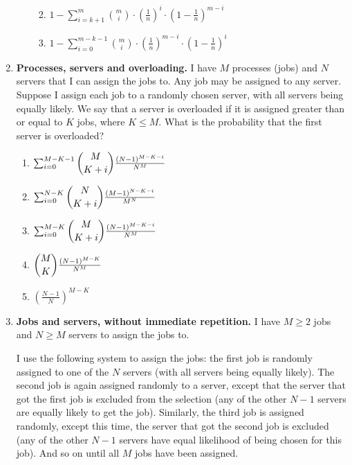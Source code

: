 \documentclass[11pt, preview]{standalone} %
\begin{document}
\begin{enumerate}
\begin{enumerate}
\begin{Multi}
\begin{enumerate}
\TrueChoice\item $1 - \sum_{i = k+1}^{m}\binom{m}{i}\cdot\left(\frac{1}{n}\right)^{i}\cdot \left(1-\frac{1}{n}\right)^{m-i}$
\TrueChoice\item $1 - \sum_{i = 0}^{m-k-1}\binom{m}{i}\cdot\left(\frac{1}{n}\right)^{m-i}\cdot \left(1-\frac{1}{n}\right)^{i}$
\end{enumerate}
\end{Multi}
\end{enumerate}
\item {\bf Processes, servers and overloading.} I have $M$ processes (jobs) and 
    $N$ servers that I can assign the jobs to. Any job may be assigned to any 
    server. Suppose I assign each job to a randomly chosen server, with all 
    servers being equally likely. We say that a server is overloaded if it is 
    assigned greater than or equal to $K$ jobs, where $K \leq M$. What is the 
    probability that the first server is overloaded?
\begin{Multi}
\begin{enumerate}
    \FalseChoice\item $\sum_{i=0}^{M-K-1} \dbinom{M}{K+i} \frac{(N-1)^{M-K-i}}{N^{M}}$
    \FalseChoice\item $\sum_{i=0}^{N-K} \dbinom{N}{K+i} \frac{(M-1)^{N-K-i}}{M^{N}}$
    \TrueChoice\item $\sum_{i=0}^{M-K} \dbinom{M}{K+i} \frac{(N-1)^{M-K-i}}{N^{M}}$
    \FalseChoice\item $\dbinom{M}{K} \frac{(N-1)^{M-K}}{N^{M}}$
    \FalseChoice\item $\left(\frac{N-1}{N}\right)^{M-K}$
\end{enumerate}
\end{Multi}
\item {\bf Jobs and servers, without immediate repetition.} I have $M\geq 2$ 
    jobs and $N \geq M$ servers to assign the jobs to.
    
    I use the following system to assign the jobs: the 
    first job is randomly assigned to one of the $N$ servers (with all servers 
    being equally likely). The second job is again assigned randomly to a 
    server, except that the server that got the first job is excluded from the 
    selection (any of the other $N-1$ servers are equally likely to get the job). 
    Similarly, the third job is assigned randomly, except this time, the 
    server that got the second job is excluded (any of the other $N-1$ servers 
    have equal likelihood of being chosen for this job). And so on until all 
    $M$ jobs have been assigned.


\end{enumerate}
\end{document}
